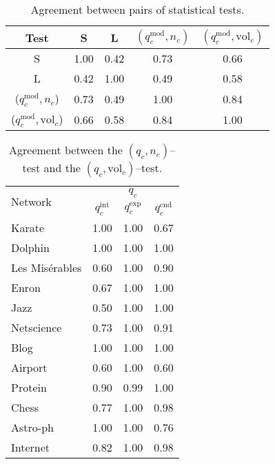 \documentclass[fleqn,10pt]{wlscirep}
\def\qmod{q^{\text{mod}}}
\def\qint{q^{\text{int}}}
\def\qexp{q^{\text{exp}}}
\def\qcnd{q^{\text{cnd}}}
\def\vol{\text{vol}}
\begin{document}
\clearpage
\begin{table}
\centering
\caption{
Agreement between pairs of statistical tests. 
}
\label{ta:emp_match}
\setlength{\tabcolsep}{10pt}
\begin{tabular}{c|cccc}
 Test    &     \multirow{1}{4em}{\centering S}     & \multirow{1}{4em}{\centering L} & \multirow{1}{4em}{\centering $(\qmod_c, n_c)$} & \multirow{1}{4em}{\centering $(\qmod_c, \vol_c)$} \\ \hline \hline
S         & 1.00 & 0.42 & 0.73 & 0.66\\
L         & 0.42 & 1.00 & 0.49 & 0.58\\
($\qmod_c, n_c$)    & 0.73 & 0.49 & 1.00 & 0.84\\
($\qmod_c, \vol_c$)    & 0.66 & 0.58 & 0.84 & 1.00\\ \hline
\end{tabular}
\end{table}
\clearpage
\begin{table}
\centering
\caption{
Agreement between the $(q_c,n_c)$--test and the $(q_c,\vol_c)$--test. 
}
\label{ta:emp_match_other_qfunc}
\setlength{\tabcolsep}{7pt}
\begin{tabular}{l|ccc}
\multirow{2}{*}{Network} & \multicolumn{3}{c}{$q_c$} \\\cline{2-4} 
         & $\qint_c$ & $\qexp_c$ & $\qcnd_c$\\ \hline \hline
Karate             & 1.00 & 1.00 & 0.67\\
Dolphin         & 1.00 & 1.00 & 1.00\\
Les Mis\'{e}rables     & 0.60 & 1.00 & 0.90\\
Enron             & 0.67 & 1.00 & 1.00\\
Jazz             & 0.50 & 1.00 & 1.00\\
Netscience         & 0.73 & 1.00 & 0.91\\
Blog             & 1.00 & 1.00 & 1.00\\
Airport         & 0.60 & 1.00 & 0.60\\
Protein         & 0.90 & 0.99 & 1.00\\
Chess             & 0.77 & 1.00 & 0.98\\
Astro-ph         & 1.00 & 1.00 & 0.76\\
Internet         & 0.82 & 1.00 & 0.98\\ \hline
\end{tabular}
\end{table}

\clearpage
 

\end{document}
